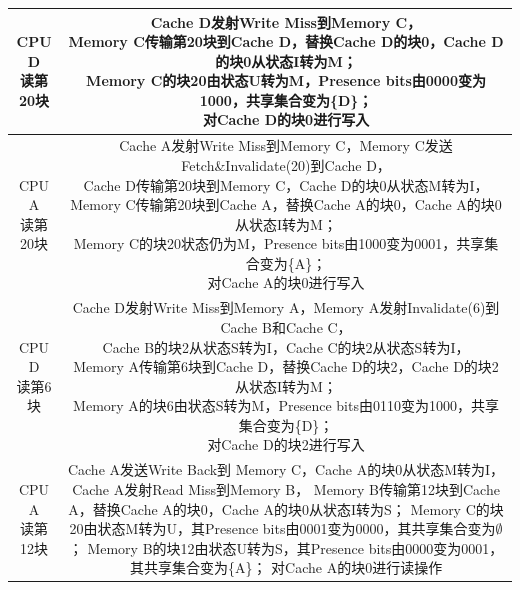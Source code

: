 \documentclass[UTF8]{article}
\begin{document}
\begin{table}[H]
{\begin{tabular}{cc}
            \hline
            \makecell[c]{CPU D\\读第20块} & \makecell[l]{Cache D发射Write Miss到Memory C，\\Memory C传输第20块到Cache D，替换Cache D的块0，Cache D的块0从状态I转为M；\\Memory C的块20由状态U转为M，Presence bits由0000变为1000，共享集合变为\{D\}；\\对Cache D的块0进行写入} \\
            \hline
            \makecell[c]{CPU A\\读第20块} & \makecell[l]{Cache A发射Write Miss到Memory C，Memory C发送Fetch\&Invalidate(20)到Cache D，\\Cache D传输第20块到Memory C，Cache D的块0从状态M转为I，\\Memory C传输第20块到Cache A，替换Cache A的块0，Cache A的块0从状态I转为M；\\Memory C的块20状态仍为M，Presence bits由1000变为0001，共享集合变为\{A\}；\\对Cache A的块0进行写入} \\
            \hline
            \makecell[c]{CPU D\\读第6块} & \makecell[l]{Cache D发射Write Miss到Memory A，Memory A发射Invalidate(6)到Cache B和Cache C，\\Cache B的块2从状态S转为I，Cache C的块2从状态S转为I，\\Memory A传输第6块到Cache D，替换Cache D的块2，Cache D的块2从状态I转为M；\\Memory A的块6由状态S转为M，Presence bits由0110变为1000，共享集合变为\{D\}；\\对Cache D的块2进行写入} \\
            \hline
            \makecell[c]{CPU A\\读第12块} & \makecell[l]{Cache A发送Write Back到 Memory C，Cache A的块0从状态M转为I，Cache A发射Read Miss到Memory B，\\Memory B传输第12块到Cache A，替换Cache A的块0，Cache A的块0从状态I转为S；\\Memory C的块20由状态M转为U，其Presence bits由0001变为0000，其共享集合变为$\emptyset$；\\Memory B的块12由状态U转为S，其Presence bits由0000变为0001，其共享集合变为\{A\}；\\对Cache A的块0进行读操作} \\
            \hline
        \end{tabular}
        }
    \end{table}
\end{document}
